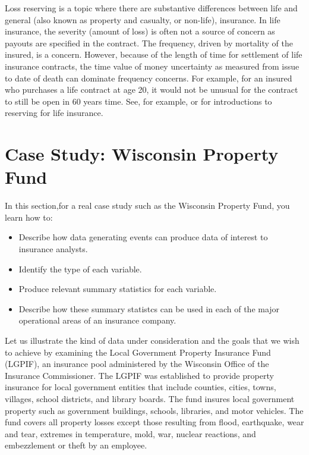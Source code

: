 \documentclass[]{book}
\providecommand{\tightlist}{%
  \setlength{\itemsep}{0pt}\setlength{\parskip}{0pt}}
\begin{document}
Loss reserving is a topic where there are substantive differences
between life and general (also known as property and casualty, or
non-life), insurance. In life insurance, the severity (amount of loss)
is often not a source of concern as payouts are specified in the
contract. The frequency, driven by mortality of the insured, is a
concern. However, because of the length of time for settlement of life
insurance contracts, the time value of money uncertainty as measured
from issue to date of death can dominate frequency concerns. For
example, for an insured who purchases a life contract at age 20, it
would not be unusual for the contract to still be open in 60 years time.
See, for example, \citep{bowers1986actuarial} or
\citep{dickson2013actuarial} for introductions to reserving for life
insurance.

\section{Case Study: Wisconsin Property Fund}\label{S:LGPIF}

In this section,for a real case study such as the Wisconsin Property
Fund, you learn how to:

\begin{itemize}
\tightlist
\item
  Describe how data generating events can produce data of interest to
  insurance analysts.
\item
  Identify the type of each variable.
\item
  Produce relevant summary statistics for each variable.
\item
  Describe how these summary statistcs can be used in each of the major
  operational areas of an insurance company.
\end{itemize}

Let us illustrate the kind of data under consideration and the goals
that we wish to achieve by examining the Local Government Property
Insurance Fund (LGPIF), an insurance pool administered by the Wisconsin
Office of the Insurance Commissioner. The LGPIF was established to
provide property insurance for local government entities that include
counties, cities, towns, villages, school districts, and library boards.
The fund insures local government property such as government buildings,
schools, libraries, and motor vehicles. The fund covers all property
losses except those resulting from flood, earthquake, wear and tear,
extremes in temperature, mold, war, nuclear reactions, and embezzlement
or theft by an employee.
\end{document}
